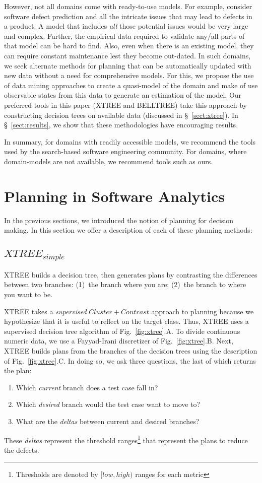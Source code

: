 \documentclass[sigconf, proceedings, 9pt]{acmart}
\newcommand{\be}{\begin{enumerate}}
\newcommand{\ee}{\end{enumerate}}
\newcommand{\tion}[1]{\S~\ref{sect:#1}}
\newcommand{\fig}[1]{Fig.~\ref{fig:#1}}
\begin{document}
However, not all domains come with ready-to-use models. For example, consider 
software defect prediction and all the intricate issues that may lead to 
defects in a product. A model that includes {\em all} those potential issues 
would be very large and complex. Further, the empirical data required to 
validate any/all parts of that model can be hard to find. Also, even when there 
is an existing model, they can require constant  maintenance lest they become 
out-dated. In such domains, we seek alternate methods for planning that can be 
automatically updated with new data without a need for comprehensive models. 
For this, we propose the use of data mining approaches to create a quasi-model 
of the domain 
and make of use observable states from this data to generate an estimation of 
the model. Our preferred tools in this paper (XTREE and BELLTREE) take this 
approach by constructing decision trees on available data (discussed in 
\tion{xtree}). In \tion{results}, we show that these methodologies have 
encouraging results.

In summary, for domains with readily accessible models, we recommend
the tools used by the search-based
software engineering community. For domains, where domain-models are not 
available, we recommend tools such as ours. 


\section{Planning in Software Analytics}
\label{sect:motivate}

In the previous sections, we introduced the notion of planning for decision 
making. In this section we offer a description of each of these planning 
methods:

\subsection{$XTREE_{simple}$}
\label{sect:XTREE}



XTREE builds a decision tree,  then generates
plans by contrasting the differences between two branches:
(1)~the branch where you are; (2)~the branch to where you want to be.

XTREE takes a {\em supervised} $Cluster+Contrast$ approach to planning because 
we hypothesize that it is useful to reflect on the target class. Thus, XTREE 
uses a supervised decision tree algorithm of \fig{xtree}.A. To divide 
continuous numeric data, we use a Fayyad-Irani discretizer of \fig{xtree}.B.
Next, XTREE builds plans from the branches of the decision trees using the 
description of \fig{xtree}.C.
In doing so, we ask three questions, the last of which returns the plan:
\be
\item
Which {\em current} branch does a test case fall in?
\item Which {\em desired} branch would the test case want to move to?
\item What are the {\em deltas} between current and desired branches? 
\ee
These \textit{deltas} represent the threshold ranges\footnote{Thresholds are 
denoted by $[low,high)$ ranges for each metric} that represent the plans to 
reduce the defects. 
\end{document}
